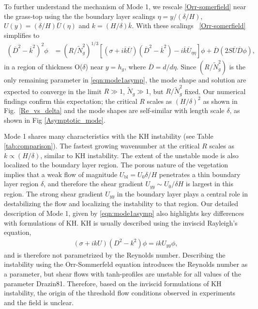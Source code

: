 \documentclass[12pt]{report}   %
\newcommand{\hg}{h_g}
\newcommand{\Rey}{{R}}
\newcommand{\Ndg}{\tilde{N}_g}
\newcommand{\ubl}{U_\text{bl}}
\renewcommand{\bar}{\overline}
\begin{document}
To further understand the mechanism of Mode 1, we rescale \eqref{Orr-somerfield} near the grass-top using the the boundary layer scalings $\eta = y/(\delta/H)$, 
$U(y) = (\delta/H)\bar{U}(\eta)$ and $k = (H/\delta) \bar{k}$.
With these scalings ~\eqref{Orr-somerfield} simplifies to
\begin{equation}
\begin{split}
\left(\bar{D}^2 -\bar{k}^{2} \right)^2\phi &= (\Rey/\Ndg^2)^{1/3} \left[ \left({\sigma}+i\bar{k}\bar{U}\right) \left(\bar{D}^2-\bar{k}^2\right) -i\bar{k}\bar{U}_{\eta\eta}\right]\phi + \bar{D}\left(2S \bar{U} \bar{D} \phi\right),
\label{eqn:mode1asymp}
\end{split}
\end{equation}
in a region of thickness O($\delta$) near $y=\hg$, where $\bar{D} = d/d\eta$. 
Since $(\Rey/\Ndg^2)$ is the only remaining parameter in \eqref{eqn:mode1asymp}, the mode shape and solution are expected to converge in the limit $\Rey \gg 1$, $\Ndg \gg 1$, but $\Rey/\Ndg^2$ fixed.
Our numerical findings confirm this expectation; the critical $\Rey$ scales as $(H/\delta)^2$ as shown in Fig.~\ref{Re_vs_delta} and the mode shapes are self-similar with length scale $\delta$, as shown in Fig \ref{Asymptotic_mode}. 

Mode 1 shares many characteristics with the KH instability (see Table \ref{tab:comparison}). 
The fastest growing wavenumber at the critical $\Rey$ scales as $k \propto (H/\delta)$, similar to KH instability. 
The extent of the unstable mode is also localized to the boundary layer region.
The porous nature of the vegetation implies that a weak flow of magnitude $\ubl = U_0 \delta/H$ penetrates a thin boundary layer region $\delta$, and therefore the shear gradient $U_{yy} \sim U_0/\delta H$ is largest in this region. 
The strong shear gradient $U_{yy}$ in the boundary layer plays a central role in destabilizing the flow and localizing the instability to that region. 
Our detailed description of Mode 1, given by \eqref{eqn:mode1asymp} also highlights key differences with formulations of KH. 
KH is usually described using the inviscid Rayleigh's equation, 
\begin{align}
\left(\sigma+ikU\right) \left(D^2-k^2\right)\phi =  ikU_{yy}\phi, 
\label{eqn:Rayleigh}
\end{align}
and is therefore not parametrized by the Reynolds number.
Describing the instability using the Orr-Sommerfeld equation introduces the Reynolds number as a parameter, but shear flows with tanh-profiles are unstable for all values of the parameter {Drazin81}.
Therefore, based on the inviscid formulations of KH instability, the origin of the threshold flow conditions observed in experiments and the field is unclear.
\end{document}
